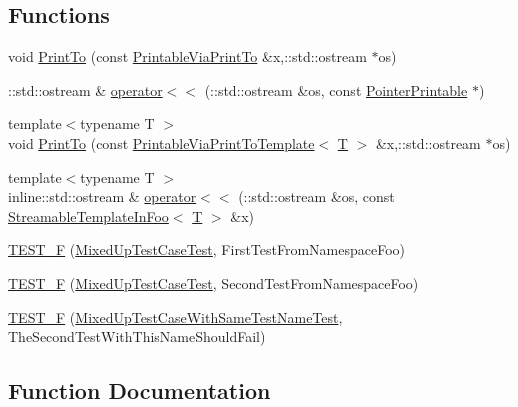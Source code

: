\subsection*{Functions}
\begin{DoxyCompactItemize}
\item 
void \hyperlink{namespacefoo_a6808585dc0cb2884adeb4f39e3cb95cf}{Print\+To} (const \hyperlink{structfoo_1_1_printable_via_print_to}{Printable\+Via\+Print\+To} \&x,\+::std\+::ostream $\ast$os)
\item 
\+::std\+::ostream \& \hyperlink{namespacefoo_a65f8809f6af7f69f5cc842493caf4491}{operator$<$$<$} (\+::std\+::ostream \&os, const \hyperlink{structfoo_1_1_pointer_printable}{Pointer\+Printable} $\ast$)
\item 
{\footnotesize template$<$typename T $>$ }\\void \hyperlink{namespacefoo_a27945da9cb5c9d3d51b69e6429c2f46d}{Print\+To} (const \hyperlink{classfoo_1_1_printable_via_print_to_template}{Printable\+Via\+Print\+To\+Template}$<$ \hyperlink{functions__7_8js_adf1f3edb9115acb0a1e04209b7a9937b}{T} $>$ \&x,\+::std\+::ostream $\ast$os)
\item 
{\footnotesize template$<$typename T $>$ }\\inline\+::std\+::ostream \& \hyperlink{namespacefoo_abe04f604d114085b0b9af25600ef00da}{operator$<$$<$} (\+::std\+::ostream \&os, const \hyperlink{classfoo_1_1_streamable_template_in_foo}{Streamable\+Template\+In\+Foo}$<$ \hyperlink{functions__7_8js_adf1f3edb9115acb0a1e04209b7a9937b}{T} $>$ \&x)
\item 
\hyperlink{namespacefoo_a0d50eecc97df56ae625078848ba9c98a}{T\+E\+S\+T\+\_\+F} (\hyperlink{classfoo_1_1_mixed_up_test_case_test}{Mixed\+Up\+Test\+Case\+Test}, First\+Test\+From\+Namespace\+Foo)
\item 
\hyperlink{namespacefoo_a7911fd62b6ae405016caed779b2f95dc}{T\+E\+S\+T\+\_\+F} (\hyperlink{classfoo_1_1_mixed_up_test_case_test}{Mixed\+Up\+Test\+Case\+Test}, Second\+Test\+From\+Namespace\+Foo)
\item 
\hyperlink{namespacefoo_a2bc2a2547ff38da0ecf68676e75583cd}{T\+E\+S\+T\+\_\+F} (\hyperlink{classfoo_1_1_mixed_up_test_case_with_same_test_name_test}{Mixed\+Up\+Test\+Case\+With\+Same\+Test\+Name\+Test}, The\+Second\+Test\+With\+This\+Name\+Should\+Fail)
\end{DoxyCompactItemize}


\subsection{Function Documentation}
